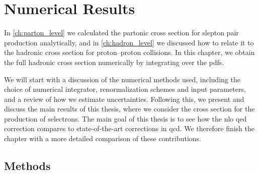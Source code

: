 \chapter{Numerical Results}\label{ch:results}

In \cref{ch:parton_level} we calculated the partonic cross section for slepton pair production analytically, and in \cref{ch:hadron_level} we discussed how to relate it to the hadronic cross section for proton--proton collisions.
In this chapter, we obtain the full hadronic cross section numerically by integrating over the \glspl{pdf}.

We will start with a discussion of the numerical methods used, including the choice of numerical integrator, renormalization schemes and input parameters, and a review of how we estimate uncertainties.
Following this, we present and discuss the main results of this thesis, where we consider the cross section for the production of selectrons.
The main goal of this thesis is to see how the \gls{nlo} \gls{qed} correction compares to state-of-the-art corrections in \gls{qcd}.
We therefore finish the chapter with a more detailed comparison of these contributions.


\section{Methods}


